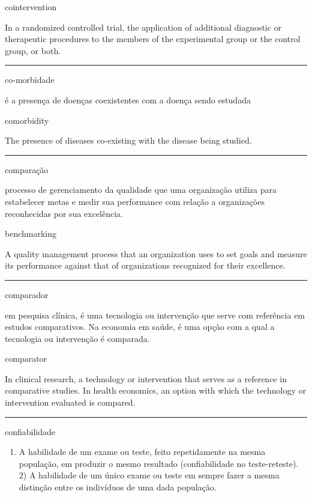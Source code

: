 \documentclass[
  openany]{book}
\providecommand{\tightlist}{%
  \setlength{\itemsep}{0pt}\setlength{\parskip}{0pt}}
\begin{document}
cointervention

In a randomized controlled trial, the application of additional diagnostic or therapeutic procedures to the members of the experimental group or the control group, or both.

\begin{center}\rule{0.5\linewidth}{0.5pt}\end{center}

co-morbidade

é a presença de doenças coexistentes com a doença sendo estudada

comorbidity

The presence of diseases co-existing with the disease being studied.

\begin{center}\rule{0.5\linewidth}{0.5pt}\end{center}

comparação

processo de gerenciamento da qualidade que uma organização utiliza para estabelecer metas e medir sua performance com relação a organizações reconhecidas por sua excelência.

benchmarking

A quality management process that an organization uses to set goals and measure its performance against that of organizations recognized for their excellence.

\begin{center}\rule{0.5\linewidth}{0.5pt}\end{center}

comparador

em pesquisa clínica, é uma tecnologia ou intervenção que serve com referência em estudos comparativos. Na economia em saúde, é uma opção com a qual a tecnologia ou intervenção é comparada.

comparator

In clinical research, a technology or intervention that serves as a reference in comparative studies. In health economics, an option with which the technology or intervention evaluated is compared.

\begin{center}\rule{0.5\linewidth}{0.5pt}\end{center}

confiabilidade

\begin{enumerate}
\def\labelenumi{\arabic{enumi})}
\tightlist
\item
  A habilidade de um exame ou teste, feito repetidamente na mesma população, em produzir o mesmo resultado (confiabilidade no teste-reteste). 2) A habilidade de um único exame ou teste em sempre fazer a mesma distinção entre os indivíduos de uma dada população.
\end{enumerate}
\end{document}

